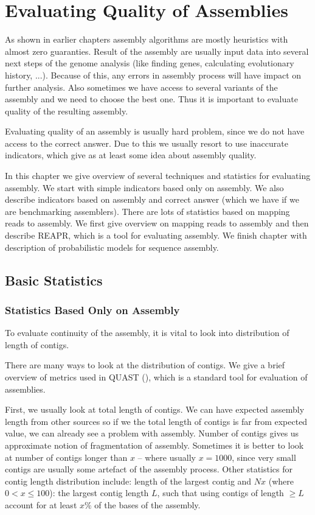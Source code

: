 \chapter{Evaluating Quality of Assemblies}

As shown in earlier chapters assembly algorithms are mostly
heuristics with almost zero guaranties. 
Result of the assembly are usually input data into several next steps
of the genome analysis (like finding genes, calculating evolutionary history, ...).
Because of this, any errors in assembly process will have impact on further analysis.
Also sometimes we have access to several variants of the assembly and we need
to choose the best one.
Thus it is important to evaluate quality of the resulting assembly.

Evaluating quality of an assembly is usually hard problem,
since we do not have access to the correct answer.
Due to this we usually resort to use inaccurate indicators, which
give as at least some idea about assembly quality.

In this chapter we give overview of several techniques and statistics
for evaluating assembly. We start with simple indicators based
only on assembly. We also describe indicators based on assembly and correct
answer (which we have if we are benchmarking assemblers). 
There are lots of statistics based on mapping reads to assembly. We first give
overview on mapping reads to assembly and then describe REAPR, which is a tool
for evaluating assembly. We finish chapter with description
of probabilistic models for sequence assembly.

\section{Basic Statistics}

\subsection{Statistics Based Only on Assembly}

To evaluate continuity of the assembly, it is vital
to look into distribution of length of contigs.

There are many ways to look at the distribution of contigs.
We give a brief overview of metrics used in QUAST (\cite{Quast}), which
is a standard tool for evaluation of assemblies.

First, we usually look at total length of contigs. We can have expected assembly 
length from other sources so if we the total length of contigs is far from expected
value, we can already see a problem with assembly.
Number of contigs gives us approximate notion of fragmentation of assembly.
Sometimes it is better to look at number of contigs longer than $x$ -- where usually $x = 1000$,
since very small contigs are usually some artefact of the assembly process.
Other statistics for contig length distribution include:
length of the largest contig and $Nx$ (where $0 < x \leq 100$):
the largest contig length $L$, such that using contigs
of length $\geq L$ account for at least $x \%$ of the bases of the assembly.

